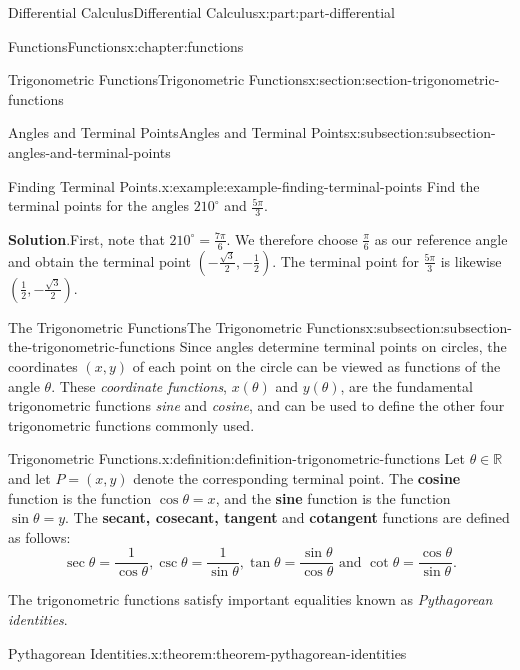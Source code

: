 \documentclass[twoside,10pt,]{tufte-book}
\newcommand{\blocktitlefont}{\relax}
\newcommand{\terminology}[1]{\textbf{#1}}
\numberwithin{equation}{part}
\newcommand{\RR}{\mathbb{R}}
\begin{document}
\begin{partptx}{Differential Calculus}{}{Differential Calculus}{}{}{x:part:part-differential}
\begin{chapterptx}{Functions}{}{Functions}{}{}{x:chapter:functions}
\begin{sectionptx}{Trigonometric Functions}{}{Trigonometric Functions}{}{}{x:section:section-trigonometric-functions}
\begin{subsectionptx}{Angles and Terminal Points}{}{Angles and Terminal Points}{}{}{x:subsection:subsection-angles-and-terminal-points}
\begin{example}{Finding Terminal Points.}{x:example:example-finding-terminal-points}%
Find the terminal points for the angles \(210^{\circ}\) and \(\frac{5\pi}{3}\).%
\par\smallskip%
\noindent\textbf{\blocktitlefont Solution}.\hypertarget{g:solution:idm35150999023808}{}\quad{}First, note that \(210^{\circ} = \frac{7\pi}{6}\). We therefore choose \(\frac{\pi}{6}\) as our reference angle and obtain the terminal point \((-\frac{\sqrt{3}}{2}, -\frac{1}{2})\). The terminal point for \(\frac{5\pi}{3}\) is likewise \((\frac{1}{2}, -\frac{\sqrt{3}}{2})\).%
\end{example}
\end{subsectionptx}
%
%
\typeout{************************************************}
\typeout{************************************************}
%
\begin{subsectionptx}{The Trigonometric Functions}{}{The Trigonometric Functions}{}{}{x:subsection:subsection-the-trigonometric-functions}
Since angles determine terminal points on circles, the coordinates \((x, y)\) of each point on the circle can be viewed as functions of the angle \(\theta\). These \emph{coordinate functions}, \(x(\theta)\) and \(y(\theta)\), are the fundamental trigonometric functions \emph{sine} and \emph{cosine}, and can be used to define the other four trigonometric functions commonly used.%
\begin{definition}{Trigonometric Functions.}{x:definition:definition-trigonometric-functions}%
%
Let \(\theta\in\RR\) and let \(P = (x,y)\) denote the corresponding terminal point. The \terminology{cosine} function is the function \(\cos\theta = x\), and the \terminology{sine} function is the function \(\sin\theta = y\). The \terminology{secant, cosecant, tangent} and \terminology{cotangent} functions are defined as follows:%
\begin{equation*}
\sec\theta = \frac{1}{\cos\theta}, \csc\theta = \frac{1}{\sin\theta}, \tan\theta = \frac{\sin\theta}{\cos\theta}\text{ and }\cot\theta = \frac{\cos\theta}{\sin\theta}\text{.}
\end{equation*}
%
\end{definition}
The trigonometric functions satisfy important equalities known as \emph{Pythagorean identities}.%
\begin{theorem}{Pythagorean Identities.}{}{x:theorem:theorem-pythagorean-identities}%
%

\end{theorem}
\end{subsectionptx}
\end{sectionptx}
\end{chapterptx}
\end{partptx}
\end{document}
